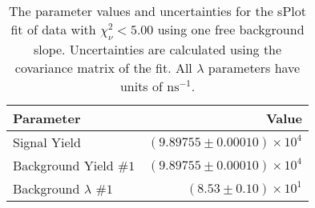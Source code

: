 
\begin{table}[ht]
    \begin{center}
        \begin{tabular}{lr}\toprule
            Parameter & Value \\\midrule
            Signal Yield & $(9.89755 \pm 0.00010) \times 10^{4}$ \\
            Background Yield $\#1$ & $(9.89755 \pm 0.00010) \times 10^{4}$ \\
            Background $\lambda$ $\#1$ & $(8.53 \pm 0.10) \times 10^{1}$ \\\bottomrule
        \end{tabular}
        \caption{The parameter values and uncertainties for the sPlot fit of data with $\chi^2_\nu < 5.00$ using one free background slope. Uncertainties are calculated using the covariance matrix of the fit. All $\lambda$ parameters have units of $\si{\nano\second}^{-1}$.}\label{tab:splot-fit-results-chisqdof-5.00-free-1}
    \end{center}
\end{table}
